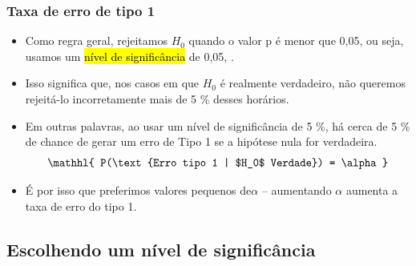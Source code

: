\documentclass[11pt]{beamer}
\begin{document}
\begin{frame}
\frametitle{Taxa de erro de tipo 1}

\begin{itemize}

\item Como regra geral, rejeitamos $ H_0 $ quando o valor p é menor que 0,05, ou seja, usamos um \hl {nível de significância} de 0,05, .

\pause

\item Isso significa que, nos casos em que $ H_0 $ é realmente verdadeiro, não queremos rejeitá-lo incorretamente mais de 5 \% desses horários. 

\pause

\item Em outras palavras, ao usar um nível de significância de 5 \%, há cerca de 5 \% de chance de gerar um erro de Tipo 1 se a hipótese nula for verdadeira.
\[ \mathhl{ P(\text{Erro tipo 1 | $H_0$ Verdade}) = \alpha } \]

\pause

\item É por isso que preferimos valores pequenos de$\alpha$ -- aumentando $\alpha$ aumenta a taxa de erro do tipo 1.

\end{itemize}

\end{frame}


\subsection{Escolhendo um nível de significância}

\end{document}
